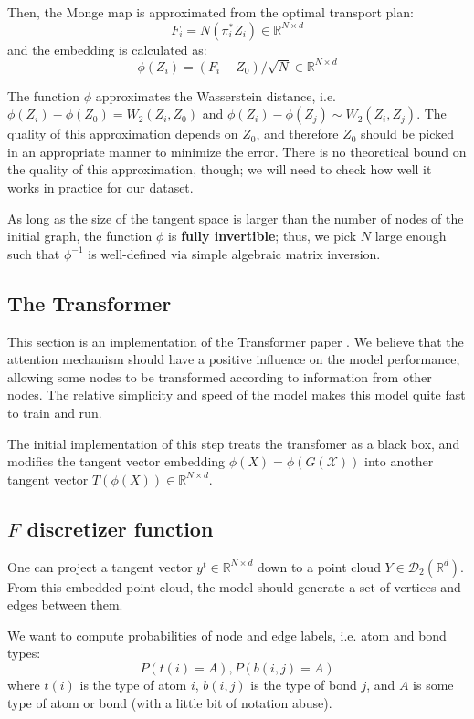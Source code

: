 \documentclass{article}
\begin{document}
Then, the Monge map is approximated from the optimal transport plan:
\[F_i = N(\pi_i^*Z_i) \in \mathbb{R}^{N\times d} \]
and the embedding is calculated as:
\[\phi(Z_i) = (F_i-Z_0)/\sqrt{N} \in \mathbb{R}^{N\times d} \]

The function $\phi$ approximates the Wasserstein distance, i.e. $\phi(Z_i) - \phi(Z_0) = W_2(Z_i, Z_0)$ and $\phi(Z_i) - \phi(Z_j) \sim W_2(Z_i, Z_j)$. The quality of this approximation depends on $Z_0$, and therefore $Z_0$ should be picked in an appropriate manner to minimize the error. There is no theoretical bound on the quality of this approximation, though; we will need to check how well it works in practice for our dataset.

As long as the size of the tangent space is larger than the number of nodes of the initial graph, the function $\phi$ is \textbf{fully invertible}; thus, we pick $N$ large enough such that $\phi^{-1}$ is well-defined via simple algebraic matrix inversion.

\subsection{The Transformer}

This section is an implementation of the Transformer paper \cite{DBLP:journals/corr/VaswaniSPUJGKP17}. We believe that the attention mechanism should have a positive influence on the model performance, allowing some nodes to be transformed according to information from other nodes. The relative simplicity and speed of the model makes this model quite fast to train and run.

The initial implementation of this step treats the transfomer as a black box, and modifies the tangent vector embedding $\phi(X) = \phi(G(\mathcal{X}))$ into another tangent vector $T(\phi(X))\in \mathbb{R}^{N\times d}$.

\subsection{$F$ discretizer function}

One can project a tangent vector $y^t\in \mathbb{R}^{N\times d}$ down to a point cloud $Y\in \mathscr{D}_2(\mathbb{R}^d)$. From this embedded point cloud, the model should generate a set of vertices and edges between them.

We want to compute probabilities of node and edge labels, i.e. atom and bond types:
\[P(t(i) = A), P(b(i,j) = A) \]
where $t(i)$ is the type of atom $i$, $b(i,j)$ is the type of bond $j$, and $A$ is some type of atom or bond (with a little bit of notation abuse).
\end{document}
